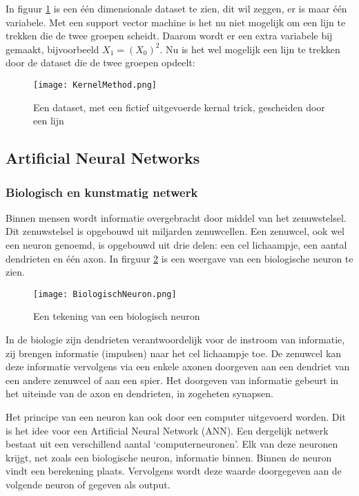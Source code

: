 In figuur \ref{fig:SupVectorMachine2} is een \'{e}\'{e}n dimensionale dataset te zien, dit wil zeggen, er is maar \'{e}\'{e}n variabele. Met een support vector machine is het nu niet mogelijk om een lijn te trekken die de twee groepen scheidt. Daarom wordt er een extra variabele bij gemaakt, bijvoorbeeld $X_{1} = (X_{0})^{2}$. Nu is het wel mogelijk een lijn te trekken door de dataset die de twee groepen opdeelt:

\begin{figure}[h]
  \centering
    \texttt{[image: KernelMethod.png]}
  \caption{Een dataset, met een fictief uitgevoerde kernal trick, gescheiden door een lijn}
  \label{fig:SupVectorMachine2}
\end{figure}

\subsection{Artificial Neural Networks}
\subsubsection{Biologisch en kunstmatig netwerk}
Binnen mensen wordt informatie overgebracht door middel van het zenuwstelsel. Dit zenuwstelsel is opgebouwd uit miljarden zenuwcellen. Een zenuwcel, ook wel een neuron genoemd, is opgebouwd uit drie delen: een cel lichaampje, een aantal dendrieten en \'{e}\'{e}n axon. In firguur \ref{fig:BiologischNeuron} is een weergave van een biologische neuron te zien.

\begin{figure}[h]
  \centering
    \texttt{[image: BiologischNeuron.png]}
  \caption{Een tekening van een biologisch neuron}
  \label{fig:BiologischNeuron}
\end{figure}

In de biologie zijn dendrieten verantwoordelijk voor de instroom van informatie, zij brengen informatie (impulsen) naar het cel lichaampje toe. De zenuwcel kan deze informatie vervolgens via een enkele axonen doorgeven aan een dendriet van een andere zenuwcel of aan een spier. Het doorgeven van informatie gebeurt in het uiteinde van de axon en dendrieten, in zogeheten synapsen.

Het principe van een neuron kan ook door een computer uitgevoerd worden. Dit is het idee voor een Artificial Neural Network (ANN). Een dergelijk netwerk bestaat uit een verschillend aantal ‘computerneuronen’. Elk van deze neuronen krijgt, net zoals een biologische neuron, informatie binnen. Binnen de neuron vindt een berekening plaats. Vervolgens wordt deze waarde doorgegeven aan de volgende neuron of gegeven als output.

